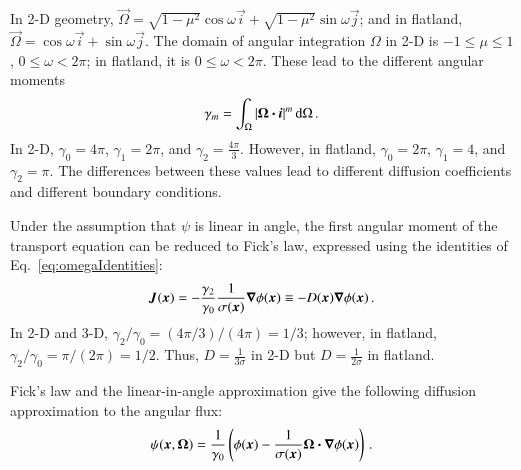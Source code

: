 \documentclass{anstrans}
\begin{document}
In 2-D geometry, $\vec{\Omega}=\sqrt{1-\mu^2} \cos \omega \vec{i} +
\sqrt{1-\mu^2} \sin \omega \vec{j}$; and in flatland, $\vec{\Omega}=\cos \omega
\vec{i} + \sin \omega \vec{j}$. The domain of angular integration $\Omega$ in
2-D is $-1\le\mu\le1$, $0 \le \omega < 2\pi$; in flatland, it is $0 \le \omega
< 2\pi$. These lead to the different angular moments
\begin{equation}\label{eq:omegaIdentities}
  \gamma_m = \int_{\Omega} \left| \bm{\Omega}\bm{\cdot} \bm{i} \right|^m \mathop{}\!\mathrm{d}\Omega\,.
\end{equation}
In 2-D, $\gamma_0=4\pi$, $\gamma_1=2\pi$, and $\gamma_2=\frac{4\pi}{3}$.
However, in flatland, $\gamma_0=2\pi$, $\gamma_1=4$, and $\gamma_2=\pi$. The
differences between these values lead to different diffusion 
coefficients and different boundary conditions.

Under the assumption that $\psi$ is linear in angle, the first angular moment
of the transport equation can be reduced to Fick's law, expressed using the
identities of Eq.~\eqref{eq:omegaIdentities}:
\begin{equation} \label{eq:fickGeneral}
  \bm{J}(\bm{x})
  = - \frac{\gamma_2}{\gamma_0} \frac{1}{\sigma(\bm{x})} \bm{\nabla} \phi(\bm{x})
  \equiv -D(\bm{x}) \bm{\nabla} \phi(\bm{x})\,.
\end{equation}
In 2-D and 3-D, $\gamma_2/\gamma_0 = (4\pi / 3) / (4\pi) = 1/3$; however, in
flatland, $\gamma_2/\gamma_0 = \pi / (2\pi) = 1/2$. Thus, $D=\frac{1}{3\sigma}$ in
2-D but $D=\frac{1}{2\sigma}$ in flatland.

Fick's law and the linear-in-angle approximation give the following diffusion
approximation to the angular flux:
\begin{equation} \label{eq:diffusionIntensity}
  \psi(\bm{x}, \bm{\Omega})
  = \frac{1}{\gamma_0} \left( \phi(\bm{x})
  - \frac{1}{\sigma(\bm{x})}
  \bm{\Omega} \bm{\cdot} \bm{\nabla} \phi(\bm{x}) \right) \,.
\end{equation}

\end{document}
